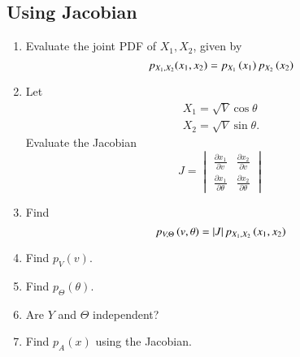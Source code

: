 \subsection{Using Jacobian}
%
\begin{enumerate}[label=\thesubsection.\arabic*.,ref=\thesubsection.\theenumi]

\item
Evaluate the joint PDF of $X_1,X_2$,  given by
%
\begin{equation}
p_{X_1,X_2}(x_1,x_2) = p_{X_1}\left(x_1\right)p_{X_2}\left(x_2\right)
\end{equation}
%

%
\item
Let 
\begin{align}
 X_1 = \sqrt{V}\cos \theta
\\
 X_2 = \sqrt{V} \sin \theta.
\end{align}
Evaluate the Jacobian 
%
\begin{equation}
J =
\begin{vmatrix}
\frac{\partial x_1}{\partial v} & \frac{\partial x_2}{\partial v} \\
\frac{\partial x_1}{\partial \theta} & \frac{\partial x_2}{\partial \theta} 
\end{vmatrix}
\end{equation}
%

%
\item
Find
%
\begin{equation}
p_{V,\Theta}\left(v,\theta\right) = \left\vert J\right\vert p_{X_1,X_2}\left(x_1,x_2\right)
\end{equation}
%

%
\item
Find $p_{V}(v)$.  

%
%
\item
Find $p_{\Theta}(\theta)$.  

%
\item
Are $Y$ and $\Theta$ independent?

\item
Find $p_{A}(x)$ using the Jacobian.

%
%

%
%
%
\end{enumerate}
